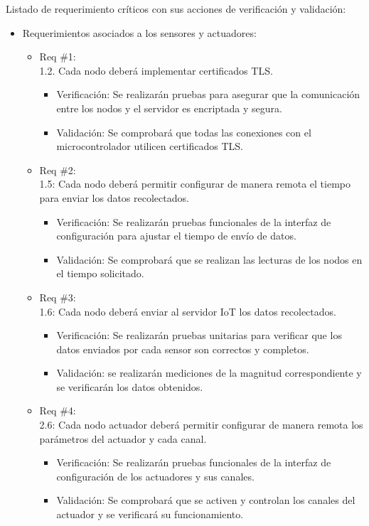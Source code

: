 Listado de requerimiento críticos con sus acciones de verificación y
validación:

\begin{itemize}
	\item Requerimientos asociados a los sensores y actuadores:
	      \begin{itemize}
		      \item Req \#1:\\ 1.2. Cada nodo deberá implementar certificados TLS.
		            \begin{itemize}
			            \item Verificación: Se realizarán pruebas para asegurar que la comunicación entre los
			                  nodos y el servidor es encriptada y segura.
			            \item Validación: Se comprobará que todas las conexiones con el microcontrolador
			                  utilicen certificados TLS.
		            \end{itemize}
		      \item Req \#2: \\ 1.5: Cada nodo deberá permitir configurar de manera remota el
		            tiempo para enviar los datos recolectados.
		            \begin{itemize}
			            \item Verificación: Se realizarán pruebas funcionales de la interfaz de configuración
			                  para ajustar el tiempo de envío de datos.
			            \item Validación: Se comprobará que se realizan las lecturas de los nodos en el
			                  tiempo solicitado.
		            \end{itemize}
		      \item Req \#3: \\ 1.6: Cada nodo deberá enviar al servidor IoT los datos
		            recolectados.
		            \begin{itemize}
			            \item Verificación: Se realizarán pruebas unitarias para verificar que los datos
			                  enviados por cada sensor son correctos y completos.
			            \item Validación: se realizarán mediciones de la magnitud correspondiente y se
			                  verificarán los datos obtenidos.
		            \end{itemize}
		      \item Req \#4: \\ 2.6: Cada nodo actuador deberá permitir configurar de manera remota
		            los parámetros del actuador y cada canal.
		            \begin{itemize}
			            \item Verificación: Se realizarán pruebas funcionales de la interfaz de configuración
			                  de los actuadores y sus canales.
			            \item Validación: Se comprobará que se activen y controlan los canales del actuador y
			                  se verificará su funcionamiento.
		            \end{itemize}
	      \end{itemize}


\end{itemize}

